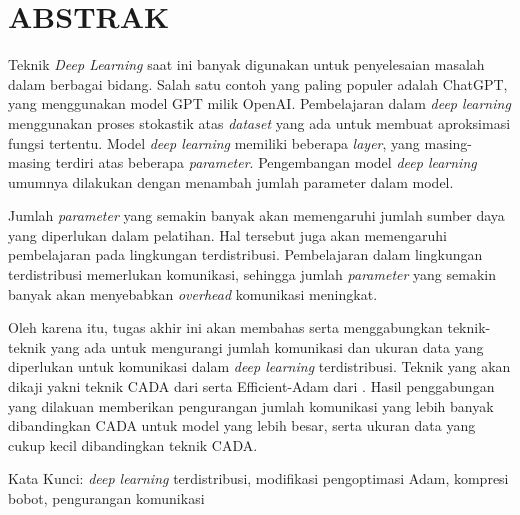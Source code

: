 \clearpage
\chapter*{ABSTRAK}

Teknik \emph{Deep Learning} saat ini banyak digunakan untuk penyelesaian masalah dalam berbagai bidang. Salah satu contoh yang paling populer adalah ChatGPT, yang menggunakan model GPT milik OpenAI. Pembelajaran dalam \emph{deep learning} menggunakan proses stokastik atas \emph{dataset} yang ada untuk membuat aproksimasi fungsi tertentu. Model \emph{deep learning} memiliki beberapa \emph{layer}, yang masing-masing terdiri atas beberapa \emph{parameter}. Pengembangan model \emph{deep learning} umumnya dilakukan dengan menambah jumlah parameter dalam model.

Jumlah \emph{parameter} yang semakin banyak akan memengaruhi jumlah sumber daya yang diperlukan dalam pelatihan. Hal tersebut juga akan memengaruhi pembelajaran pada lingkungan terdistribusi. Pembelajaran dalam lingkungan terdistribusi memerlukan komunikasi, sehingga jumlah \emph{parameter} yang semakin banyak akan menyebabkan \emph{overhead} komunikasi meningkat.

Oleh karena itu, tugas akhir ini akan membahas serta menggabungkan teknik-teknik yang ada untuk mengurangi jumlah komunikasi dan ukuran data yang diperlukan untuk komunikasi dalam \emph{deep learning} terdistribusi. Teknik yang akan dikaji yakni teknik CADA dari \textcite{Chen2021CADA} serta Efficient-Adam dari \textcite{Chen2022Efficient}. Hasil penggabungan yang dilakuan memberikan pengurangan jumlah komunikasi yang lebih banyak dibandingkan CADA untuk model yang lebih besar, serta ukuran data yang cukup kecil dibandingkan teknik CADA.

Kata Kunci: \emph{deep learning} terdistribusi, modifikasi pengoptimasi Adam, kompresi bobot, pengurangan komunikasi
\clearpage
